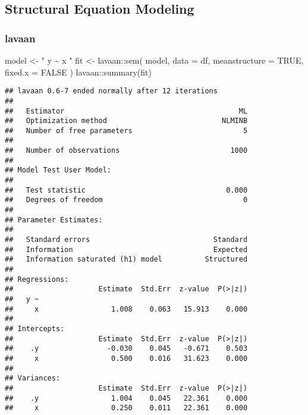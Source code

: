 \documentclass[
]{book}
\newenvironment{Shaded}{\begin{snugshade}}{\end{snugshade}}
\newcommand{\AttributeTok}[1]{\textcolor[rgb]{0.77,0.63,0.00}{#1}}
\newcommand{\ConstantTok}[1]{\textcolor[rgb]{0.00,0.00,0.00}{#1}}
\newcommand{\FunctionTok}[1]{\textcolor[rgb]{0.00,0.00,0.00}{#1}}
\newcommand{\NormalTok}[1]{#1}
\newcommand{\OtherTok}[1]{\textcolor[rgb]{0.56,0.35,0.01}{#1}}
\newcommand{\SpecialCharTok}[1]{\textcolor[rgb]{0.00,0.00,0.00}{#1}}
\newcommand{\StringTok}[1]{\textcolor[rgb]{0.31,0.60,0.02}{#1}}
\theoremstyle{definition}
\theoremstyle{definition}
\theoremstyle{definition}
\theoremstyle{remark}
\begin{document}
\hypertarget{structural-equation-modeling}{%
\subsection{Structural Equation Modeling}\label{structural-equation-modeling}}

\hypertarget{lavaan-lavaan2012}{%
\subsubsection{\texorpdfstring{lavaan \citep{lavaan2012}}{lavaan {[}@lavaan2012{]}}}\label{lavaan-lavaan2012}}

\begin{Shaded}
\begin{Highlighting}[]
\NormalTok{model }\OtherTok{\textless{}{-}} \StringTok{"}
\StringTok{  y \textasciitilde{} x}
\StringTok{"}
\NormalTok{fit }\OtherTok{\textless{}{-}}\NormalTok{ lavaan}\SpecialCharTok{::}\FunctionTok{sem}\NormalTok{(}
\NormalTok{  model,}
  \AttributeTok{data =}\NormalTok{ df,}
  \AttributeTok{meanstructure =} \ConstantTok{TRUE}\NormalTok{,}
  \AttributeTok{fixed.x =} \ConstantTok{FALSE}
\NormalTok{)}
\NormalTok{lavaan}\SpecialCharTok{::}\FunctionTok{summary}\NormalTok{(fit)}
\end{Highlighting}
\end{Shaded}

\begin{verbatim}
## lavaan 0.6-7 ended normally after 12 iterations
## 
##   Estimator                                         ML
##   Optimization method                           NLMINB
##   Number of free parameters                          5
##                                                       
##   Number of observations                          1000
##                                                       
## Model Test User Model:
##                                                       
##   Test statistic                                 0.000
##   Degrees of freedom                                 0
## 
## Parameter Estimates:
## 
##   Standard errors                             Standard
##   Information                                 Expected
##   Information saturated (h1) model          Structured
## 
## Regressions:
##                    Estimate  Std.Err  z-value  P(>|z|)
##   y ~                                                 
##     x                 1.008    0.063   15.913    0.000
## 
## Intercepts:
##                    Estimate  Std.Err  z-value  P(>|z|)
##    .y                -0.030    0.045   -0.671    0.503
##     x                 0.500    0.016   31.623    0.000
## 
## Variances:
##                    Estimate  Std.Err  z-value  P(>|z|)
##    .y                 1.004    0.045   22.361    0.000
##     x                 0.250    0.011   22.361    0.000
\end{verbatim}
\end{document}
